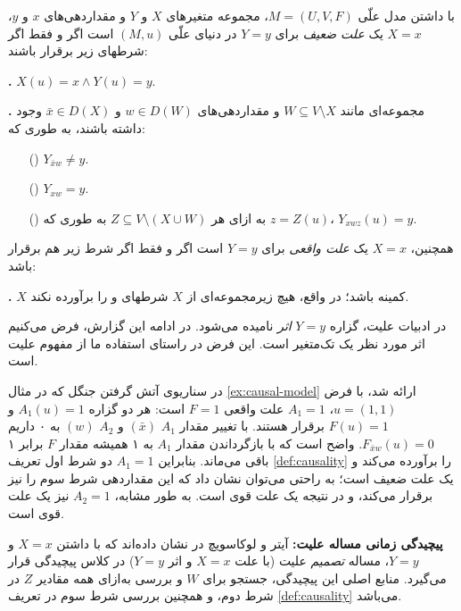 \begin{definition}\label{def:causality}
  با داشتن مدل علّی
  $M=(U,V,F)$،
  مجموعه متغیرهای
  $X$ و $Y$
  و مقداردهی‌های
  $x$ و $y$،
  $X=x$
  یک
  \textit{علت ضعیف}
  برای
  $Y=y$
  در دنیای علّی
  $(M,u)$
  است اگر و فقط اگر شرطهای زیر برقرار باشند:

  \textbf{.} $X(u)=x \wedge Y(u)=y$.

  \textbf{.}
  مجموعه‌ای مانند
  $W \subseteq V \setminus X$
  و مقداردهی‌های
  $w \in D(W)$ و $\bar{x} \in D(X)$
  وجود داشته باشند، به طوری که:
  \begin{itemize}
    \item[(\lr{a})] $Y_{\bar{x}w} \neq y$.
    \item[(\lr{b})] $Y_{xw}=y$.
    \item[(\lr{c})]
    به ازای هر
    $Z \subseteq V \setminus (X \cup W)$
    به طوری که
    $z = Z(u)$،
    $Y_{xwz}(u)=y$.
  \end{itemize}

  همچنین،
  $X=x$
  یک
  \textit{علت واقعی}
  برای
  $Y=y$
  است اگر و فقط اگر شرط زیر هم برقرار باشد:
  
  \textbf{.} $X$
  کمینه باشد؛ در واقع، هیچ زیرمجموعه‌ای از
  $X$
  شرطهای
   و 
  را برآورده نکند.
\end{definition}

در ادبیات علیت، گزاره
$Y=y$
\textit{اثر}
نامیده می‌شود.
در ادامه این گزارش، فرض می‌کنیم اثر مورد نظر
یک تک‌متغیر است. این فرض در راستای استفاده ما
از مفهوم علیت است.

\begin{example}\label{ex:causality}
  در سناریوی آتش گرفتن جنگل که در مثال
  \ref{ex:causal-model}
  ارائه شد، با فرض
  $u=(1,1)$،
  $A_1=1$
  علت واقعی
  $F=1$
  است: هر دو گزاره
  $A_1(u)=1$ و $F(u)=1$
  برقرار هستند.
  با تغییر مقدار
  $A_1$ $(\bar{x})$ و $A_2$ $(w)$
  به ۰
  داریم
  $F_{\bar{x}w}(u)=0$.
  واضح است که با بازگرداندن مقدار
  $A_1$ به ۱
  همیشه مقدار
  $F$
  برابر ۱ باقی می‌ماند.
  بنابراین
  $A_1=1$
  دو شرط اول تعریف
  \ref{def:causality}
  را برآورده می‌کند و یک علت ضعیف است؛
  به راحتی می‌توان نشان داد که این مقداردهی
  شرط سوم را نیز برقرار می‌کند،
  و در نتیجه یک علت قوی است.
  به طور مشابه،
  $A_2=1$
  نیز یک علت قوی است.
\end{example}

\textbf{پیچیدگی زمانی مساله علیت:}
آیتر و لوکاسویچ در
\cite{eiter2001complexity}
نشان داده‌اند که با داشتن
$X=x$ و $Y=y$،
مساله
\textit{تصمیم}
علیت
(با علت
$X=x$
و اثر
$Y=y$)
در کلاس پیچیدگی
قرار می‌گیرد. منابع اصلی این پیچیدگی،
جستجو برای
$W$
و بررسی به‌ازای همه مقادیر
$Z$
در شرط دوم، و همچنین بررسی شرط سوم
در تعریف
\ref{def:causality}
می‌باشد.
